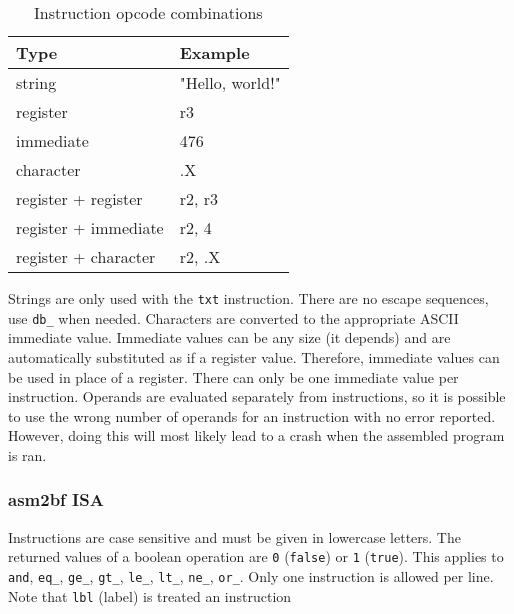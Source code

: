 \documentclass{article}
\begin{document}
\begin{table}[h]
\centering
\caption{Instruction opcode combinations}
\label{tab:instropcom}
\begin{tabular}{|l|l|}
\hline
\textbf{Type} & \textbf{Example} \\ \hline
string & "Hello, world!" \\ \hline
register & r3 \\ \hline
immediate & 476 \\ \hline
character & .X \\ \hline
register + register & r2, r3 \\ \hline
register + immediate & r2, 4 \\ \hline
register + character & r2, .X \\ \hline
\end{tabular}
\end{table}

\par Strings are only used with the \verb|txt| instruction. There are no escape sequences, use \verb|db_| when needed. Characters are converted to the appropriate ASCII immediate value. Immediate values can be any size (it depends) and are automatically substituted as if a register value. Therefore, immediate values can be used in place of a register. There can only be one immediate value per instruction. Operands are evaluated separately from instructions, so it is possible to use the wrong number of operands for an instruction with no error reported. However, doing this will most likely lead to a crash when the assembled program is ran.

\subsubsection{asm2bf ISA}
\par Instructions are case sensitive and must be given in lowercase letters. The returned values of a boolean operation are \verb|0| (\verb|false|) or \verb|1| (\verb|true|). This applies to \verb|and|, \verb|eq_|, \verb|ge_|, \verb|gt_|, \verb|le_|, \verb|lt_|, \verb|ne_|, \verb|or_|. Only one instruction is allowed per line. Note that \verb|lbl| (label) is treated an instruction

\end{document}
